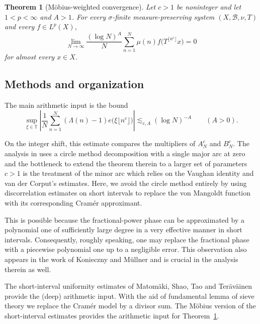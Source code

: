 \documentclass[10pt,leqno]{amsart}
\newcounter{counter}
\newcounter{counter2}
\numberwithin{equation}{section}
\numberwithin{counter2}{section}
\newtheorem{theorem}[counter]{Theorem}
\theoremstyle{definition}
\theoremstyle{plain}
\begin{document}
	\begin{theorem}[M\"obius-weighted convergence]\label{t:mobius-convergence}
		Let $c>1$ be noninteger and let $1<p<\infty$ and $A>1$. For every 
		$\sigma$-finite measure-preserving system $(X,\mathcal B,\nu,T)$
		and every $f\in L^p(X)$,
		\[
		\lim_{N\to\infty}\frac{\left(\log N\right)^A}{N}\sum_{n=1}^N
		\mu(n)f\bigl(T^{\lfloor n^c\rfloor}x\bigr)=0
		\]
		for almost every $x\in X$.
	\end{theorem}
	
	\subsection{Methods and organization}
	
	The main arithmetic input is the bound
	\begin{equation}\label{eq:intro-prime-comparison}
		\sup_{\xi\in\mathbb T}
		\left|\frac1N\sum_{n=1}^N
		(\Lambda(n)-1)e\bigl(\xi\lfloor n^c\rfloor\bigr)\right|
		\lesssim_{c,A}(\log N)^{-A}
		\qquad(A>0).
	\end{equation}


    
	On the integer shift, this estimate compares the multipliers of
	$A_N^{c}$ and $B_N^{c}$.
	The analysis in \cite{BDDS24} uses a circle method decomposition
	with a single major arc at zero and the bottleneck to extend the theorem therein to a larger set of parameters $c>1$ is the treatment of the minor arc which relies on the Vaughan identity and van der Corput's estimates. Here, we avoid the circle method entirely by using discorrelation estimates on short intervals to replace the von Mangoldt function with its corresponding Cram\'er approximant.
	
	  This is possible because the fractional-power phase can be approximated
	by a polynomial one of sufficiently large degree in a very effective manner in short intervals. Consequently, roughly speaking, one may replace the fractional phase with a piecewise polynomial one up to a negligible error.  This observation
	also appears in the work of Konieczny and M\"ullner
	\cite{CK24} and is crucial in the analysis therein as well.
	
    
    The short-interval uniformity estimates of Matom\"aki, Shao, Tao and Ter\"av\"ainen
	\cite{Matom_ki_2023} provide the (deep) arithmetic input. With the aid of fundamental lemma of sieve theory we replace the Cram\'er model by a divisor sum. The
	M\"obius version of the short-interval estimates provides the
	arithmetic input for Theorem~\ref{t:mobius-convergence}.
    
\end{document}
